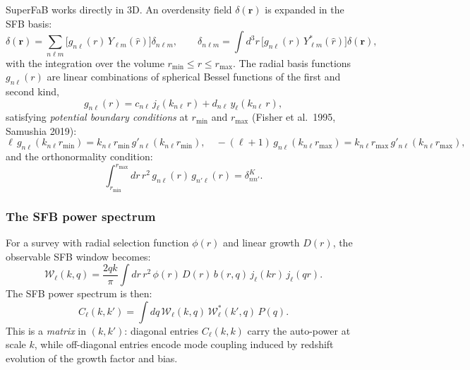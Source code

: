SuperFaB works directly in 3D. An overdensity field
$\delta(\mathbf{r})$ is expanded in the SFB basis:
\begin{equation}
    \delta(\mathbf{r}) =
    \sum_{n\ell m}\bigl[g_{n\ell}(r)\,Y_{\ell m}(\hat{r})\bigr]
    \delta_{n\ell m},
    \qquad
    \delta_{n\ell m} =
    \int d^3r\,\bigl[g_{n\ell}(r)\,Y_{\ell m}^*(\hat{r})\bigr]
    \delta(\mathbf{r}),
\end{equation}
with the integration over the volume $r_{\min}\le r\le r_{\max}$.
The radial basis functions $g_{n\ell}(r)$ are linear combinations of
spherical Bessel functions of the first and second kind,
\begin{equation}
    g_{n\ell}(r) = c_{n\ell}\,j_\ell(k_{n\ell}\,r)
                 + d_{n\ell}\,y_\ell(k_{n\ell}\,r),
\end{equation}
satisfying \emph{potential boundary conditions} at $r_{\min}$ and
$r_{\max}$ (Fisher et al.~1995, Samushia 2019):
\begin{equation}
    \ell\, g_{n\ell}(k_{n\ell}r_{\min})
    = k_{n\ell}r_{\min}\,g'_{n\ell}(k_{n\ell}r_{\min}),
    \quad
    -({\ell+1})\,g_{n\ell}(k_{n\ell}r_{\max})
    = k_{n\ell}r_{\max}\,g'_{n\ell}(k_{n\ell}r_{\max}),
\end{equation}
and the orthonormality condition:
\begin{equation}
    \int_{r_{\min}}^{r_{\max}} dr\,r^2\,
    g_{n\ell}(r)\,g_{n'\ell}(r) = \delta_{nn'}^K.
\end{equation}

\subsubsection{The SFB power spectrum}

For a survey with radial selection function $\phi(r)$ and linear
growth $D(r)$, the observable SFB window becomes:
\begin{equation}
    \mathcal{W}_\ell(k, q) =
    \frac{2qk}{\pi}
    \int dr\,r^2\,\phi(r)\,D(r)\,b(r,q)\,
    j_\ell(kr)\,j_\ell(qr).
    \label{eq:sfb_window}
\end{equation}
The SFB power spectrum is then:
\begin{equation}
    \boxed{
    C_\ell(k, k') = \int dq\,
    \mathcal{W}_\ell(k, q)\,\mathcal{W}^*_\ell(k', q)\,P(q).
    }
    \label{eq:sfb_cll}
\end{equation}
This is a \emph{matrix} in $(k,k')$: diagonal entries
$C_\ell(k,k)$ carry the auto-power at scale $k$, while off-diagonal
entries encode mode coupling induced by redshift evolution of the
growth factor and bias.

